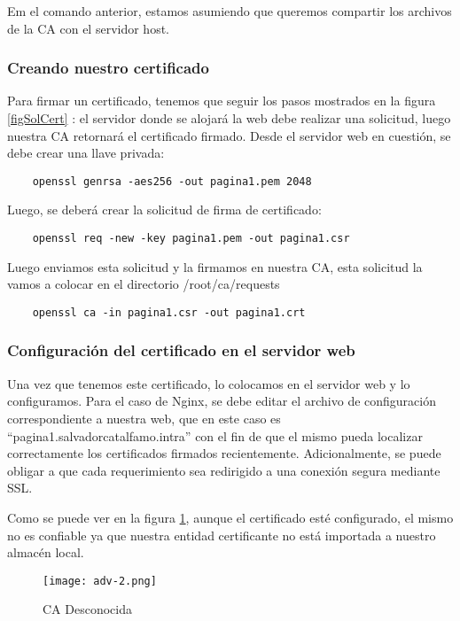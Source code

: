 Em el comando anterior, estamos asumiendo que queremos compartir los archivos de la CA con el servidor 
host.

 



\subsubsection*{Creando nuestro certificado}

Para firmar un certificado, tenemos que seguir los pasos mostrados en la figura \ref{figSolCert}
: el servidor donde se alojará la web debe realizar una solicitud, 
luego nuestra CA retornará el certificado firmado. Desde el servidor web en cuestión, se debe 
crear una llave privada:

\begin{verbatim}
    openssl genrsa -aes256 -out pagina1.pem 2048
\end{verbatim}

\noindent Luego, se deberá crear la solicitud de firma de certificado:
\begin{verbatim}
    openssl req -new -key pagina1.pem -out pagina1.csr
\end{verbatim}

\noindent Luego enviamos esta solicitud y la firmamos en nuestra CA, esta solicitud la vamos a colocar 
en el directorio /root/ca/requests
\begin{verbatim}
    openssl ca -in pagina1.csr -out pagina1.crt
\end{verbatim}

\subsubsection*{Configuración del certificado en el servidor web}
Una vez que tenemos este certificado, lo colocamos en el servidor web y 
lo configuramos. Para el caso de Nginx, se debe editar el archivo de configuración 
correspondiente a nuestra web, que en este caso es “pagina1.salvadorcatalfamo.intra”
con el fin de que el mismo pueda localizar correctamente los certificados firmados recientemente.
Adicionalmente, se puede obligar a que cada requerimiento sea redirigido a una conexión
segura mediante SSL.

Como se puede ver en la figura \ref{figCAdesc}, aunque el certificado esté configurado, 
el mismo no es confiable ya que nuestra entidad certificante no está importada a nuestro almacén 
local.

\begin{center}
    \begin{figure}   
       \begin{center}
          \texttt{[image: adv-2.png]}
       \end{center}
       \caption{CA Desconocida}
       \label{figCAdesc}
    \end{figure}
 \end{center}

